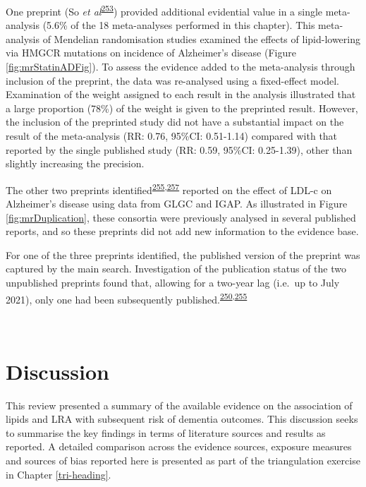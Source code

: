 \documentclass[a4paper, twoside]{templates/ociamthesis}
\begin{document}
One preprint (So \emph{et al}\textsuperscript{\protect\hyperlink{ref-so2017}{253}}) provided additional evidential value in a single meta-analysis (5.6\% of the 18 meta-analyses performed in this chapter). This meta-analysis of Mendelian randomisation studies examined the effects of lipid-lowering via HMGCR mutations on incidence of Alzheimer's disease (Figure \ref{fig:mrStatinADFig}). To assess the evidence added to the meta-analysis through inclusion of the preprint, the data was re-analysed using a fixed-effect model. Examination of the weight assigned to each result in the analysis illustrated that a large proportion (78\%) of the weight is given to the preprinted result. However, the inclusion of the preprinted study did not have a substantial impact on the result of the meta-analysis (RR: 0.76, 95\%CI: 0.51-1.14) compared with that reported by the single published study (RR: 0.59, 95\%CI: 0.25-1.39), other than slightly increasing the precision.

The other two preprints identified\textsuperscript{\protect\hyperlink{ref-andrews2019}{255},\protect\hyperlink{ref-zhu2017}{257}} reported on the effect of LDL-c on Alzheimer's disease using data from GLGC and IGAP. As illustrated in Figure \ref{fig:mrDuplication}, these consortia were previously analysed in several published reports, and so these preprints did not add new information to the evidence base.

For one of the three preprints identified, the published version of the preprint was captured by the main search. Investigation of the publication status of the two unpublished preprints found that, allowing for a two-year lag (i.e.~up to July 2021), only one had been subsequently published.\textsuperscript{\protect\hyperlink{ref-andrews2021}{250},\protect\hyperlink{ref-andrews2019}{255}}

~

\hypertarget{discussion-1}{%
\section{Discussion}\label{discussion-1}}

This review presented a summary of the available evidence on the association of lipids and LRA with subsequent risk of dementia outcomes. This discussion seeks to summarise the key findings in terms of literature sources and results as reported. A detailed comparison across the evidence sources, exposure measures and sources of bias reported here is presented as part of the triangulation exercise in Chapter \ref{tri-heading}.
\end{document}
